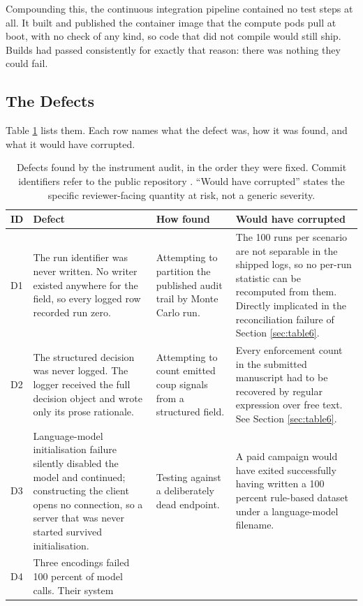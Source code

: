 \documentclass{ieeeaccess}
\begin{document}
Compounding this, the continuous integration pipeline contained no test
steps at all. It built and published the container image that the
compute pods pull at boot, with no check of any kind, so code that did
not compile would still ship. Builds had passed consistently for exactly
that reason: there was nothing they could fail.

\subsection{The Defects}
Table \ref{tab:defects} lists them. Each row names what the defect was,
how it was found, and what it would have corrupted.

\begin{table}[!t]
\caption{Defects found by the instrument audit, in the order they were
fixed. Commit identifiers refer to the public repository
\cite{kanova2026repo}. ``Would have corrupted'' states the specific
reviewer-facing quantity at risk, not a generic severity.}
\label{tab:defects}
\centering
\small
\begin{tabular}{@{}p{0.6cm}p{4.2cm}p{4.6cm}p{6.0cm}@{}}
\toprule
ID & Defect & How found & Would have corrupted \\
\midrule
D1 & The run identifier was never written. No writer existed anywhere
     for the field, so every logged row recorded run zero.
   & Attempting to partition the published audit trail by Monte Carlo run.
   & The 100 runs per scenario are not separable in the shipped logs, so
     no per-run statistic can be recomputed from them. Directly implicated
     in the reconciliation failure of Section \ref{sec:table6}. \\
D2 & The structured decision was never logged. The logger received the
     full decision object and wrote only its prose rationale.
   & Attempting to count emitted coup signals from a structured field.
   & Every enforcement count in the submitted manuscript had to be
     recovered by regular expression over free text. See Section
     \ref{sec:table6}. \\
D3 & Language-model initialisation failure silently disabled the model
     and continued; constructing the client opens no connection, so a
     server that was never started survived initialisation.
   & Testing against a deliberately dead endpoint.
   & A paid campaign would have exited successfully having written a
     100 percent rule-based dataset under a language-model filename. \\
D4 & Three encodings failed 100 percent of model calls. Their system

\end{tabular}
\end{table}
\end{document}

